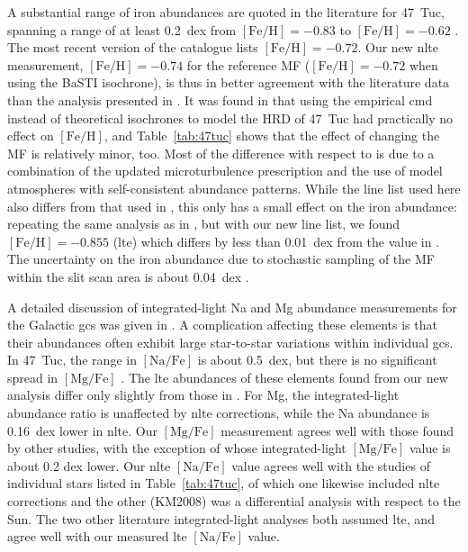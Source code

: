 \documentclass{aa}
\begin{document}
A substantial range of iron abundances are quoted in the literature for 47~Tuc, spanning a range of at least 0.2~dex from $\mathrm{[Fe/H]}=-0.83$ \citep{Lapenna2014} to
$\mathrm{[Fe/H]}=-0.62$ \citep{Pritzl2005}. The most recent version of the \citet{Harris1996} catalogue lists $\mathrm{[Fe/H]}=-0.72$. Our new \ac{nlte} measurement, $\mathrm{[Fe/H]}=-0.74$ for the reference MF ($\mathrm{[Fe/H]}=-0.72$ when using the BaSTI isochrone), is thus in better agreement with the literature data than the analysis presented in . It was found in  that using the empirical \ac{cmd}
instead of theoretical isochrones to model the HRD of 47~Tuc had practically no effect on $\mathrm{[Fe/H]}$, and Table~\ref{tab:47tuc} shows that the effect of changing the MF is relatively minor, too. Most of the difference with respect to  is due to a combination of the updated microturbulence prescription and the use of model atmospheres with self-consistent abundance patterns. While the line list used here also differs from that used in , this only has a small effect on the iron abundance:  repeating the same analysis as in , but with our new line list, we found $\mathrm{[Fe/H]}=-0.855$ (\ac{lte}) which differs by less than 0.01~dex from the value in . 
The uncertainty on the iron abundance due to stochastic sampling of the MF within the slit scan area is about 0.04~dex . 

A detailed discussion of integrated-light Na and Mg abundance measurements for the Galactic \acp{gc} was given in . A complication affecting these elements is that their abundances often exhibit large star-to-star variations within individual \acp{gc}. In 47~Tuc, the range in $\mathrm{[Na/Fe]}$ is about 0.5~dex, but there is no significant spread in $\mathrm{[Mg/Fe]}$ \citep[][hereafter C2009]{Carretta2009}.
The \ac{lte} abundances of these elements found from our new analysis differ only slightly from those in . For Mg, the integrated-light abundance ratio is unaffected by \ac{nlte} corrections, while the Na abundance is 0.16~dex lower in \ac{nlte}. Our $\mathrm{[Mg/Fe]}$ measurement agrees well with those found by other studies, with the exception of  whose integrated-light  $\mathrm{[Mg/Fe]}$ value is about 0.2 dex lower. 
Our \ac{nlte} $\mathrm{[Na/Fe]}$ value agrees well with the studies of individual stars listed in Table~\ref{tab:47tuc}, of which one  likewise included \ac{nlte} corrections and the other (KM2008) was a differential analysis with respect to the Sun. The two other literature integrated-light analyses  both assumed \ac{lte}, and agree well with our measured \ac{lte} $\mathrm{[Na/Fe]}$ value. 
\end{document}
